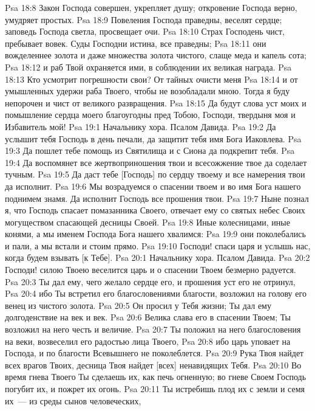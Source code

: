 \vs Psa 18:8 Закон Господа совершен, укрепляет душу; откровение Господа верно, умудряет простых.
\vs Psa 18:9 Повеления Господа праведны, веселят сердце; заповедь Господа светла, просвещает очи.
\vs Psa 18:10 Страх Господень чист, пребывает вовек. Суды Господни истина, все праведны;
\vs Psa 18:11 они вожделеннее золота и даже множества золота чистого, слаще меда и капель сота;
\vs Psa 18:12 и раб Твой охраняется ими, в соблюдении их великая награда.
\vs Psa 18:13 Кто усмотрит погрешности свои? От тайных  очисти меня
\vs Psa 18:14 и от умышленных удержи раба Твоего, чтобы не возобладали мною. Тогда я буду непорочен и чист от великого развращения.
\vs Psa 18:15 Да будут слова уст моих и помышление сердца моего благоугодны пред Тобою, Господи, твердыня моя и Избавитель мой!
\vs Psa 19:1 Начальнику хора. Псалом Давида.
\rsbpar\vs Psa 19:2 Да услышит тебя Господь в день печали, да защитит тебя имя Бога Иаковлева.
\vs Psa 19:3 Да пошлет тебе помощь из Святилища и с Сиона да подкрепит тебя.
\vs Psa 19:4 Да воспомянет все жертвоприношения твои и всесожжение твое да соделает тучным.
\vs Psa 19:5 Да даст тебе [Господь] по сердцу твоему и все намерения твои да исполнит.
\vs Psa 19:6 Мы возрадуемся о спасении твоем и во имя Бога нашего поднимем знамя. Да исполнит Господь все прошения твои.
\vs Psa 19:7 Ныне познал я, что Господь спасает помазанника Своего, отвечает ему со святых небес Своих могуществом спасающей десницы Своей.
\vs Psa 19:8 Иные колесницами, иные конями, а мы именем Господа Бога нашего хвалимся:
\vs Psa 19:9 они поколебались и пали, а мы встали и стоим прямо.
\vs Psa 19:10 Господи! спаси царя и услышь нас, когда будем взывать [к Тебе].
\vs Psa 20:1 Начальнику хора. Псалом Давида.
\rsbpar\vs Psa 20:2 Господи! силою Твоею веселится царь и о спасении Твоем безмерно радуется.
\vs Psa 20:3 Ты дал ему, чего желало сердце его, и прошения уст его не отринул,
\vs Psa 20:4 ибо Ты встретил его благословениями благости, возложил на голову его венец из чистого золота.
\vs Psa 20:5 Он просил у Тебя жизни; Ты дал ему долгоденствие на век и век.
\vs Psa 20:6 Велика слава его в спасении Твоем; Ты возложил на него честь и величие.
\vs Psa 20:7 Ты положил на него благословения на веки, возвеселил его радостью лица Твоего,
\vs Psa 20:8 ибо царь уповает на Господа, и по благости Всевышнего не поколеблется.
\vs Psa 20:9 Рука Твоя найдет всех врагов Твоих, десница Твоя найдет [всех] ненавидящих Тебя.
\vs Psa 20:10 Во время гнева Твоего Ты сделаешь их, как печь огненную; во гневе Своем Господь погубит их, и пожрет их огонь.
\vs Psa 20:11 Ты истребишь плод их с земли и семя их~--- из среды сынов человеческих,
